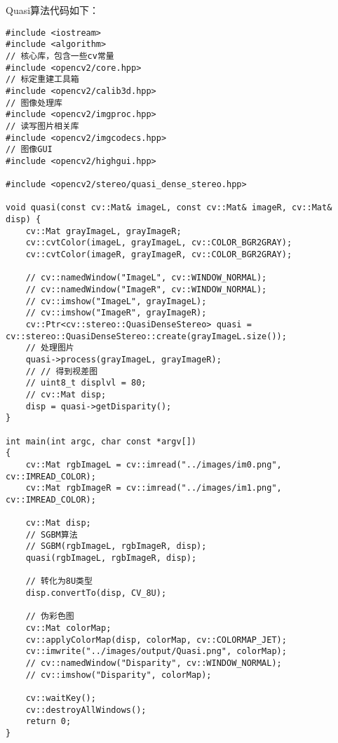 \documentclass[10.5pt, a4paper]{article}
\begin{document}
Quasi算法代码如下：
\begin{lstlisting}
#include <iostream>
#include <algorithm>
// 核心库，包含一些cv常量
#include <opencv2/core.hpp>
// 标定重建工具箱
#include <opencv2/calib3d.hpp>
// 图像处理库
#include <opencv2/imgproc.hpp>
// 读写图片相关库
#include <opencv2/imgcodecs.hpp>
// 图像GUI
#include <opencv2/highgui.hpp>

#include <opencv2/stereo/quasi_dense_stereo.hpp>

void quasi(const cv::Mat& imageL, const cv::Mat& imageR, cv::Mat& disp) {
    cv::Mat grayImageL, grayImageR;
	cv::cvtColor(imageL, grayImageL, cv::COLOR_BGR2GRAY);
	cv::cvtColor(imageR, grayImageR, cv::COLOR_BGR2GRAY);

    // cv::namedWindow("ImageL", cv::WINDOW_NORMAL);
    // cv::namedWindow("ImageR", cv::WINDOW_NORMAL);
	// cv::imshow("ImageL", grayImageL);
	// cv::imshow("ImageR", grayImageR);
    cv::Ptr<cv::stereo::QuasiDenseStereo> quasi = cv::stereo::QuasiDenseStereo::create(grayImageL.size());
    // 处理图片
    quasi->process(grayImageL, grayImageR);
    // // 得到视差图
    // uint8_t displvl = 80;
    // cv::Mat disp;
    disp = quasi->getDisparity();
}

int main(int argc, char const *argv[])
{
    cv::Mat rgbImageL = cv::imread("../images/im0.png", cv::IMREAD_COLOR);
	cv::Mat rgbImageR = cv::imread("../images/im1.png", cv::IMREAD_COLOR);

    cv::Mat disp;
    // SGBM算法
    // SGBM(rgbImageL, rgbImageR, disp);
    quasi(rgbImageL, rgbImageR, disp);

    // 转化为8U类型
    disp.convertTo(disp, CV_8U);
    
    // 伪彩色图
    cv::Mat colorMap;
    cv::applyColorMap(disp, colorMap, cv::COLORMAP_JET);
    cv::imwrite("../images/output/Quasi.png", colorMap);
    // cv::namedWindow("Disparity", cv::WINDOW_NORMAL);
	// cv::imshow("Disparity", colorMap);
    
    cv::waitKey();
    cv::destroyAllWindows();
    return 0;
}

\end{lstlisting}
\end{document}
